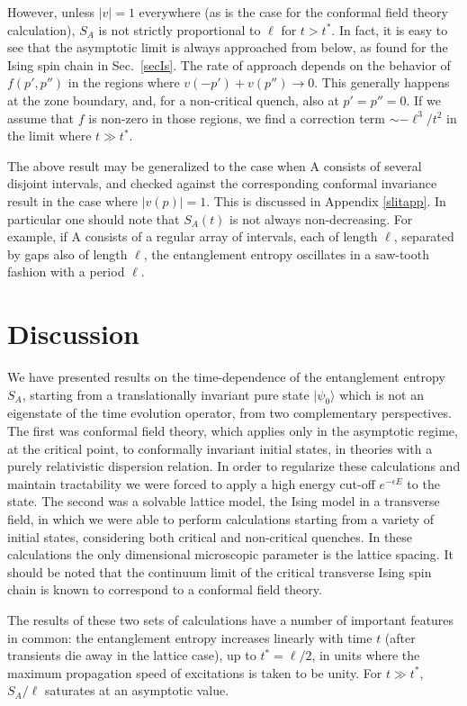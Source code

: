 \documentclass[12pt,preprint,tighten,eqsecnum,aps,floats,psfig,epsfig,amsmath,onecolumn]{revtex4-1}
\def\e{\epsilon}
\begin{document}
However, unless $|v|=1$ everywhere (as is the case for the conformal
field theory calculation), $S_A$ is not strictly proportional
to $\ell$ for $t>t^*$. In fact, it is easy to see that the asymptotic
limit is always approached from below, as found for the Ising spin chain
in Sec.~\ref{secIs}. The rate of approach depends on the behavior of
$f(p',p'')$ in the regions where $v(-p')+v(p'')\to 0$. This generally
happens at the zone boundary, and, for a non-critical quench, also at 
$p'=p''=0$. If we assume that $f$ is non-zero in those regions, we find
a correction term $\sim -\ell^3/t^2$ in the limit where $t\gg t^*$. 

The above result may be generalized to the case when A consists of
several disjoint intervals, and checked against the corresponding
conformal invariance result in the case where $|v(p)|=1$. 
This is discussed in
Appendix \ref{slitapp}. In particular one should note that $S_A(t)$ is not
always non-decreasing. For example, if A consists of a regular
array of intervals, each of length $\ell$, separated by gaps also
of length $\ell$, the entanglement entropy oscillates in a
saw-tooth fashion with a period $\ell$.



\section{Discussion}
\label{disc}

We have presented results on the time-dependence of the entanglement
entropy $S_A$, 
starting from a translationally invariant pure state $|\psi_0\rangle$
which is
not an eigenstate of the time evolution operator, from two complementary
perspectives. The first was conformal field theory, which applies only
in the asymptotic regime, at the critical point, to conformally
invariant initial states, in theories with a
purely relativistic dispersion relation. In order to regularize these
calculations and maintain tractability we were forced to apply a
high energy cut-off $e^{-\e E}$ to the state. The second was a solvable
lattice model, the Ising model in a transverse field, in which we were
able to perform calculations starting from a variety of initial
states, considering both critical and non-critical quenches. In these
calculations the only dimensional microscopic parameter is the lattice
spacing. It should be noted that the continuum limit of the critical
transverse Ising spin chain is known to correspond to a conformal
field theory.

The results of these two sets of calculations have a number of important
features in common: the entanglement entropy increases linearly with
time $t$ (after transients die away in the lattice case), up to
$t^*=\ell/2$, in units where the maximum propagation speed of excitations
is taken to be unity. For $t\gg t^*$, $S_A/\ell$ saturates at an
asymptotic value. 
\end{document}
